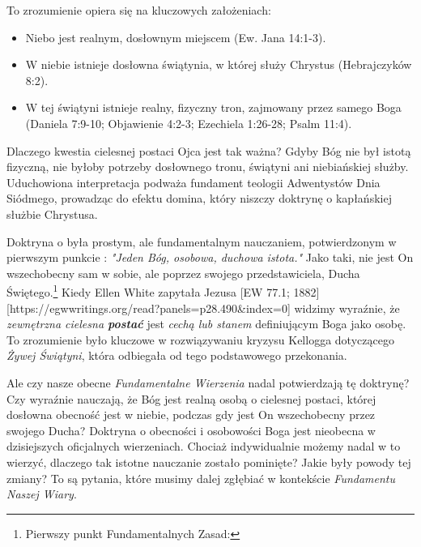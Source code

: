 To zrozumienie opiera się na kluczowych założeniach:
\begin{itemize}
    \item Niebo jest realnym, dosłownym miejscem (Ew. Jana 14:1-3).
    \item W niebie istnieje dosłowna świątynia, w której służy Chrystus (Hebrajczyków 8:2).
    \item W tej świątyni istnieje realny, fizyczny tron, zajmowany przez samego Boga (Daniela 7:9-10; Objawienie 4:2-3; Ezechiela 1:26-28; Psalm 11:4).
\end{itemize}

Dlaczego kwestia cielesnej postaci Ojca jest tak ważna? Gdyby Bóg nie był istotą fizyczną, nie byłoby potrzeby dosłownego tronu, świątyni ani niebiańskiej służby. Uduchowiona interpretacja podważa fundament teologii Adwentystów Dnia Siódmego, prowadząc do efektu domina, który niszczy doktrynę o kapłańskiej służbie Chrystusa.

Doktryna o  była prostym, ale fundamentalnym nauczaniem, potwierdzonym w pierwszym punkcie : \textit{"Jeden Bóg, osobowa, duchowa istota."} Jako taki, nie jest On wszechobecny sam w sobie, ale poprzez swojego przedstawiciela, Ducha Świętego.\footnote{Pierwszy punkt Fundamentalnych Zasad: } Kiedy Ellen White zapytała Jezusa [EW 77.1; 1882][https://egwwritings.org/read?panels=p28.490&index=0] widzimy wyraźnie, że \textit{zewnętrzna cielesna \textbf{postać}} jest \textit{cechą lub stanem} definiującym Boga jako osobę. To zrozumienie było kluczowe w rozwiązywaniu kryzysu Kellogga dotyczącego \textit{Żywej Świątyni}, która odbiegała od tego podstawowego przekonania.

Ale czy nasze obecne \textit{Fundamentalne Wierzenia} nadal potwierdzają tę doktrynę? Czy wyraźnie nauczają, że Bóg jest realną osobą o cielesnej postaci, której dosłowna obecność jest w niebie, podczas gdy jest On wszechobecny przez swojego Ducha? Doktryna o obecności i osobowości Boga jest nieobecna w dzisiejszych oficjalnych wierzeniach. Chociaż indywidualnie możemy nadal w to wierzyć, dlaczego tak istotne nauczanie zostało pominięte? Jakie były powody tej zmiany? To są pytania, które musimy dalej zgłębiać w kontekście \textit{Fundamentu Naszej Wiary}.
